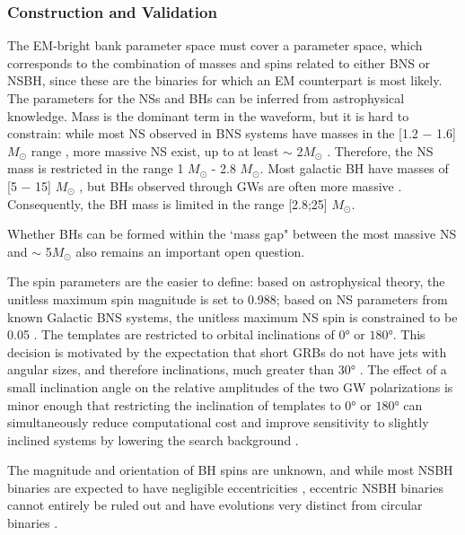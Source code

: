 \documentclass[binding=0.6cm, LaM]{sapthesis}
\begin{document}
\subsubsection{Construction and Validation}
\label{subsec:construction_and_validation}

	The EM-bright bank parameter space must cover a parameter space,
        which corresponds to the combination of masses and spins related to either BNS or NSBH,
        since these are the binaries for which an EM counterpart is most likely.
        The parameters for the NSs and BHs can be inferred from astrophysical knowledge.
        Mass is the dominant term in the waveform, but it is hard to constrain:
        while most NS observed in BNS systems have masses in the [1.2 − 1.6] $M_{\odot}$ range \cite{200},
        more massive NS exist, up to at least $\sim$ 2$M_{\odot}$  \cite{200}.
        Therefore, the NS mass is restricted in the range 1 $M_\odot$ - 2.8 $M_\odot$.
        Most galactic BH have masses of [5 − 15] $M_{\odot}$  \cite{195},
        but BHs observed through GWs are often more massive \cite{13}. \\  %
        Consequently, the BH mass is limited in the range [2.8;25] $M_\odot$.

        Whether BHs can be formed within the \lq mass gap" between the most massive NS
        and $\sim$ 5$M_{\odot}$ also remains an important open question.

        The spin parameters are the easier to define: based on astrophysical theory,
        the unitless maximum spin magnitude is set to 0.988;
        based on NS parameters from known Galactic BNS systems,
        the unitless maximum NS spin is constrained to be 0.05 \cite{136}.
        The templates are restricted to orbital inclinations of $\ang{0}$ or $\ang{180}$.
        This decision is motivated by the expectation that short GRBs do not have jets with angular sizes,
        and therefore inclinations, much greater than $\ang{30}$ \cite{136}.
        The effect of a small inclination angle on the relative amplitudes of the two GW polarizations
        is minor enough that restricting the inclination of templates to $\ang{0}$ or $\ang{180}$
        can simultaneously reduce computational cost and improve sensitivity to slightly inclined systems by lowering the search background \cite{136}.

        The magnitude and orientation of BH spins are unknown, and while most NSBH binaries
        are expected to have negligible eccentricities \cite{202},
        eccentric NSBH binaries cannot entirely be ruled out
        and have evolutions very distinct from circular binaries \cite{203}.
\end{document}
